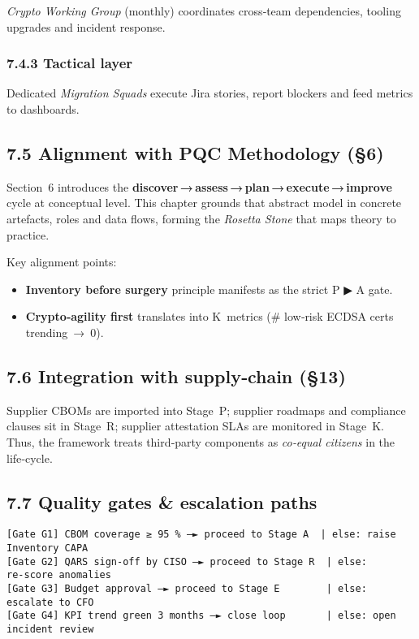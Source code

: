 \documentclass[
  english,
]{article}
\providecommand{\tightlist}{%
  \setlength{\itemsep}{0pt}\setlength{\parskip}{0pt}}
\begin{document}
\emph{Crypto Working Group} (monthly) coordinates cross‑team
dependencies, tooling upgrades and incident response.

\subsubsection{7.4.3 Tactical layer}\label{tactical-layer}

Dedicated \emph{Migration Squads} execute Jira stories, report blockers
and feed metrics to dashboards.

\subsection{7.5 Alignment with PQC Methodology
(§6)}\label{alignment-with-pqc-methodology-6}

Section~6 introduces the
\textbf{discover\,→\,assess\,→\,plan\,→\,execute\,→\,improve} cycle at
conceptual level. This chapter grounds that abstract model in concrete
artefacts, roles and data flows, forming the \emph{Rosetta Stone} that
maps theory to practice.

Key alignment points:

\begin{itemize}
\tightlist
\item
  \textbf{Inventory before surgery} principle manifests as the strict P
  ▶ A gate.
\item
  \textbf{Crypto‑agility first} translates into K~metrics (\# low‑risk
  ECDSA certs trending~→~0).
\end{itemize}

\subsection{7.6 Integration with supply‑chain
(§13)}\label{integration-with-supplychain-13}

Supplier CBOMs are imported into Stage~P; supplier roadmaps and
compliance clauses sit in Stage~R; supplier attestation SLAs are
monitored in Stage~K. Thus, the framework treats third‑party components
as \emph{co‑equal citizens} in the life‑cycle.

\subsection{7.7 Quality gates \& escalation
paths}\label{quality-gates-escalation-paths}

\begin{verbatim}
[Gate G1] CBOM coverage ≥ 95 % —► proceed to Stage A  | else: raise Inventory CAPA
[Gate G2] QARS sign‑off by CISO —► proceed to Stage R  | else: re‑score anomalies
[Gate G3] Budget approval —► proceed to Stage E        | else: escalate to CFO
[Gate G4] KPI trend green 3 months —► close loop       | else: open incident review
\end{verbatim}
\end{document}
